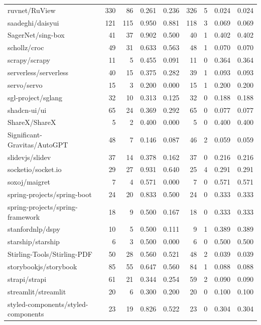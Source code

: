 \begin{tabular}{lrrrrrrrr}
ruvnet/RuView & 330 & 86 & 0.261 & 0.236 & 326 & 5 & 0.024 & 0.024 \\
saadeghi/daisyui & 121 & 115 & 0.950 & 0.881 & 118 & 3 & 0.069 & 0.069 \\
SagerNet/sing-box & 41 & 37 & 0.902 & 0.500 & 40 & 1 & 0.402 & 0.402 \\
schollz/croc & 49 & 31 & 0.633 & 0.563 & 48 & 1 & 0.070 & 0.070 \\
scrapy/scrapy & 11 & 5 & 0.455 & 0.091 & 11 & 0 & 0.364 & 0.364 \\
serverless/serverless & 40 & 15 & 0.375 & 0.282 & 39 & 1 & 0.093 & 0.093 \\
servo/servo & 15 & 3 & 0.200 & 0.000 & 15 & 1 & 0.200 & 0.200 \\
sgl-project/sglang & 32 & 10 & 0.313 & 0.125 & 32 & 0 & 0.188 & 0.188 \\
shadcn-ui/ui & 65 & 24 & 0.369 & 0.292 & 65 & 0 & 0.077 & 0.077 \\
ShareX/ShareX & 5 & 2 & 0.400 & 0.000 & 5 & 0 & 0.400 & 0.400 \\
Significant-Gravitas/AutoGPT & 48 & 7 & 0.146 & 0.087 & 46 & 2 & 0.059 & 0.059 \\
slidevjs/slidev & 37 & 14 & 0.378 & 0.162 & 37 & 0 & 0.216 & 0.216 \\
socketio/socket.io & 29 & 27 & 0.931 & 0.640 & 25 & 4 & 0.291 & 0.291 \\
soxoj/maigret & 7 & 4 & 0.571 & 0.000 & 7 & 0 & 0.571 & 0.571 \\
spring-projects/spring-boot & 24 & 20 & 0.833 & 0.500 & 24 & 0 & 0.333 & 0.333 \\
spring-projects/spring-framework & 18 & 9 & 0.500 & 0.167 & 18 & 0 & 0.333 & 0.333 \\
stanfordnlp/dspy & 10 & 5 & 0.500 & 0.111 & 9 & 1 & 0.389 & 0.389 \\
starship/starship & 6 & 3 & 0.500 & 0.000 & 6 & 0 & 0.500 & 0.500 \\
Stirling-Tools/Stirling-PDF & 50 & 28 & 0.560 & 0.521 & 48 & 2 & 0.039 & 0.039 \\
storybookjs/storybook & 85 & 55 & 0.647 & 0.560 & 84 & 1 & 0.088 & 0.088 \\
strapi/strapi & 61 & 21 & 0.344 & 0.254 & 59 & 2 & 0.090 & 0.090 \\
streamlit/streamlit & 20 & 6 & 0.300 & 0.200 & 20 & 0 & 0.100 & 0.100 \\
styled-components/styled-components & 23 & 19 & 0.826 & 0.522 & 23 & 0 & 0.304 & 0.304 \\

\end{tabular}
